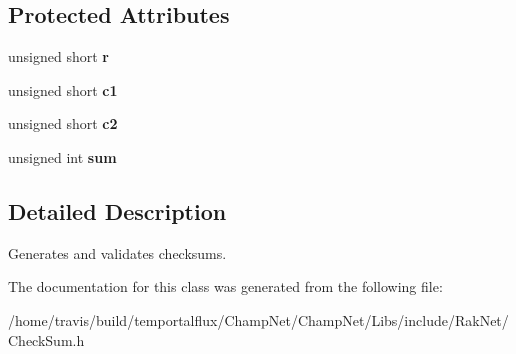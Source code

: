\subsection*{Protected Attributes}
\begin{DoxyCompactItemize}
\item 
\hypertarget{class_check_sum_a602993cbad71227cb9aee7bd0403e989}{unsigned short {\bfseries r}}\label{class_check_sum_a602993cbad71227cb9aee7bd0403e989}

\item 
\hypertarget{class_check_sum_ae992ae3022e4e27a5dcaabd21903d074}{unsigned short {\bfseries c1}}\label{class_check_sum_ae992ae3022e4e27a5dcaabd21903d074}

\item 
\hypertarget{class_check_sum_ac025b448ed972bb5766548d6a63f7cfd}{unsigned short {\bfseries c2}}\label{class_check_sum_ac025b448ed972bb5766548d6a63f7cfd}

\item 
\hypertarget{class_check_sum_a9f4beb63d32c7b1b57667f8efb3510b7}{unsigned int {\bfseries sum}}\label{class_check_sum_a9f4beb63d32c7b1b57667f8efb3510b7}

\end{DoxyCompactItemize}


\subsection{Detailed Description}
Generates and validates checksums. 

The documentation for this class was generated from the following file\-:\begin{DoxyCompactItemize}
\item 
/home/travis/build/temportalflux/\-Champ\-Net/\-Champ\-Net/\-Libs/include/\-Rak\-Net/Check\-Sum.\-h\end{DoxyCompactItemize}
